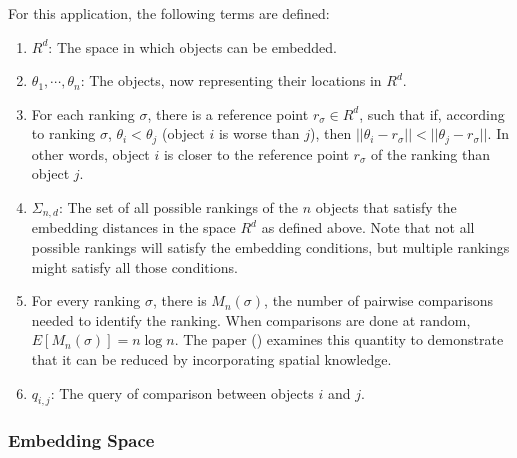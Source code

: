 \documentclass[
  letterpaper,
  numbers=noenddot,
  DIV=11]{scrreprt}
\theoremstyle{definition}
\theoremstyle{plain}
\theoremstyle{plain}
\theoremstyle{remark}
\begin{document}
For this application, the following terms are defined:

\begin{enumerate}
\def\labelenumi{\arabic{enumi}.}
\item
  \textbf{\(R^d\)}: The space in which objects can be embedded.
\item
  \textbf{\(\theta_1, \cdots,\theta_n\)}: The objects, now representing
  their locations in \(R^d\).
\item
  For each ranking \(\sigma\), there is a reference point
  \(r_{\sigma} \in R^d\), such that if, according to ranking \(\sigma\),
  \(\theta_{i} < \theta_{j}\) (object \(i\) is worse than \(j\)), then
  \(||\theta_i - r_{\sigma}|| < ||\theta_j - r_{\sigma}||\). In other
  words, object \(i\) is closer to the reference point \(r_{\sigma}\) of
  the ranking than object \(j\).
\item
  \textbf{\(\Sigma_{n,d}\)}: The set of all possible rankings of the
  \(n\) objects that satisfy the embedding distances in the space
  \(R^d\) as defined above. Note that not all possible rankings will
  satisfy the embedding conditions, but multiple rankings might satisfy
  all those conditions.
\item
  For every ranking \(\sigma\), there is \(M_n(\sigma)\), the number of
  pairwise comparisons needed to identify the ranking. When comparisons
  are done at random, \(E[M_n(\sigma)] = n\log n\). The paper
  () examines this quantity
  to demonstrate that it can be reduced by incorporating spatial
  knowledge.
\item
  \textbf{\(q_{i,j}\)}: The query of comparison between objects \(i\)
  and \(j\).
\end{enumerate}

\subsubsection*{Embedding Space}\label{embedding-space}
\end{document}
